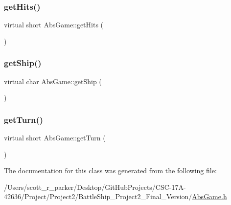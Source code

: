 \mbox{\label{class_abs_game_a038b7078fe6c66a372f1727fb4de0c6d}} 
\subsubsection{\texorpdfstring{get\+Hits()}{getHits()}}
{\footnotesize\ttfamily virtual short Abs\+Game\+::get\+Hits (\begin{DoxyParamCaption}{ }\end{DoxyParamCaption})\hspace{0.3cm}{\ttfamily [pure virtual]}}

\mbox{\label{class_abs_game_a075ff877d69ce6f7cbd4566cbd6fc3f8}} 
\subsubsection{\texorpdfstring{get\+Ship()}{getShip()}}
{\footnotesize\ttfamily virtual char Abs\+Game\+::get\+Ship (\begin{DoxyParamCaption}{ }\end{DoxyParamCaption})\hspace{0.3cm}{\ttfamily [pure virtual]}}

\mbox{\label{class_abs_game_a5d8cca6f9d9ef2d19f6dbd632289188d}} 
\subsubsection{\texorpdfstring{get\+Turn()}{getTurn()}}
{\footnotesize\ttfamily virtual short Abs\+Game\+::get\+Turn (\begin{DoxyParamCaption}{ }\end{DoxyParamCaption})\hspace{0.3cm}{\ttfamily [pure virtual]}}



The documentation for this class was generated from the following file\+:\begin{DoxyCompactItemize}
\item 
/\+Users/scott\+\_\+r\+\_\+parker/\+Desktop/\+Git\+Hub\+Projects/\+C\+S\+C-\/17\+A-\/42636/\+Project/\+Project2/\+Battle\+Ship\+\_\+\+Project2\+\_\+\+Final\+\_\+\+Version/\hyperlink{_abs_game_8h}{Abs\+Game.\+h}\end{DoxyCompactItemize}
